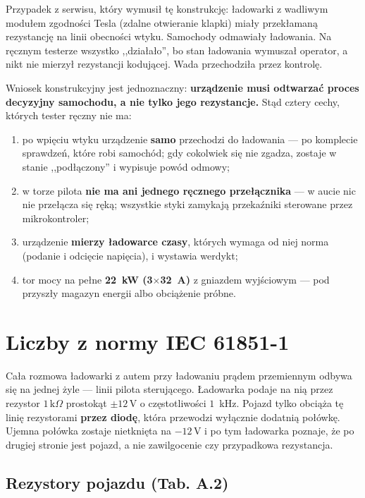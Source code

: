 \documentclass[a4paper,11pt]{article}
\newcommand{\kohm}{\,\mathrm{k}\Omega}
\newcommand{\volt}{\,\mathrm{V}}
\begin{document}
Przypadek z serwisu, który wymusił tę konstrukcję: ładowarki z wadliwym modułem
zgodności Tesla (zdalne otwieranie klapki) miały przekłamaną rezystancję na linii
obecności wtyku. Samochody odmawiały ładowania. Na ręcznym testerze wszystko
,,działało'', bo stan ładowania wymuszał operator, a nikt nie mierzył rezystancji
kodującej. Wada przechodziła przez kontrolę.

Wniosek konstrukcyjny jest jednoznaczny: \textbf{urządzenie musi odtwarzać proces
decyzyjny samochodu, a nie tylko jego rezystancje.} Stąd cztery cechy, których
tester ręczny nie ma:

\begin{enumerate}
\item po wpięciu wtyku urządzenie \textbf{samo} przechodzi do ładowania --- po
      komplecie sprawdzeń, które robi samochód; gdy cokolwiek się nie zgadza,
      zostaje w stanie ,,podłączony'' i wypisuje powód odmowy;
\item w torze pilota \textbf{nie ma ani jednego ręcznego przełącznika} --- w aucie
      nic nie przełącza się ręką; wszystkie styki zamykają przekaźniki sterowane
      przez mikrokontroler;
\item urządzenie \textbf{mierzy ładowarce czasy}, których wymaga od niej norma
      (podanie i odcięcie napięcia), i wystawia werdykt;
\item tor mocy na pełne \textbf{22~kW (3$\times$32~A)} z gniazdem wyjściowym ---
      pod przyszły magazyn energii albo obciążenie próbne.
\end{enumerate}

\section{Liczby z normy IEC 61851-1}

Cała rozmowa ładowarki z autem przy ładowaniu prądem przemiennym odbywa się na
jednej żyle --- linii pilota sterującego. Ładowarka podaje na nią przez rezystor
$1\kohm$ prostokąt $\pm 12\volt$ o częstotliwości $1$~kHz. Pojazd tylko obciąża tę
linię rezystorami \textbf{przez diodę}, która przewodzi wyłącznie dodatnią połówkę.
Ujemna połówka zostaje nietknięta na $-12\volt$ i po tym ładowarka poznaje, że po
drugiej stronie jest pojazd, a nie zawilgocenie czy przypadkowa rezystancja.

\subsection{Rezystory pojazdu (Tab. A.2)}
\end{document}
